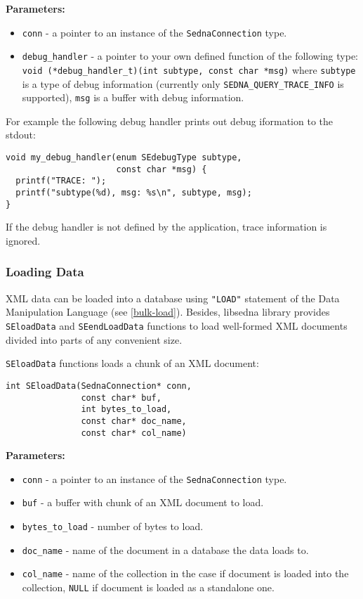 \documentclass[a4paper,12pt]{article}
\newenvironment{citemize}
{\begin{itemize}
  \setlength{\itemsep}{0pt}
  \setlength{\parskip}{0pt}
  \setlength{\parsep}{0pt}}
{\end{itemize}}
\begin{document}
\noindent
\textbf{Parameters:}

\begin{citemize}
\item\verb!conn! - a pointer to an instance of the \verb!SednaConnection! type.
\item\verb!debug_handler! - a pointer to your own defined function of the
following type: \verb!void (*debug_handler_t)(int subtype, const char *msg)!
where \verb!subtype! is a type of debug information (currently only
\verb!SEDNA_QUERY_TRACE_INFO! is supported), \verb!msg! is a buffer with debug
information.
\end{citemize}

For example the following debug handler prints out debug iformation to the
stdout:

\small{
\begin{verbatim}
void my_debug_handler(enum SEdebugType subtype,
                      const char *msg) {
  printf("TRACE: ");
  printf("subtype(%d), msg: %s\n", subtype, msg);
}
\end{verbatim}}

If the debug handler is not defined by the application, trace information is
ignored.


\subsubsection{Loading Data}

XML data can be loaded into a database using \verb!"LOAD"! statement of the Data
Manipulation Language (see \ref{bulk-load}). Besides, libsedna library provides
\verb!SEloadData! and \verb!SEendLoadData! functions to load well-formed XML
documents divided into parts of any convenient size.

\verb!SEloadData! functions loads a chunk of an XML document:

\begin{verbatim}
int SEloadData(SednaConnection* conn,
               const char* buf,
               int bytes_to_load,
               const char* doc_name,
               const char* col_name)
\end{verbatim}

\noindent
\textbf{Parameters:}

\begin{citemize}
\item\verb!conn! - a pointer to an instance of the \verb!SednaConnection! type.
\item\verb!buf! - a buffer with chunk of an XML document to load.
\item\verb!bytes_to_load! - number of bytes to load.
\item\verb!doc_name! - name of the document in a database the data loads to.
\item\verb!col_name! - name of the collection in the case if document is loaded
into the collection, \verb!NULL! if document is loaded as a standalone one.
\end{citemize}
\end{document}
